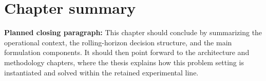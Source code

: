 \section{Chapter summary}
\label{sec:chapter03_summary}


\noindent\textbf{Planned closing paragraph:} This chapter should conclude by summarizing the operational context, the rolling-horizon decision structure, and the main formulation components. It should then point forward to the architecture and methodology chapters, where the thesis explains how this problem setting is instantiated and solved within the retained experimental line.
